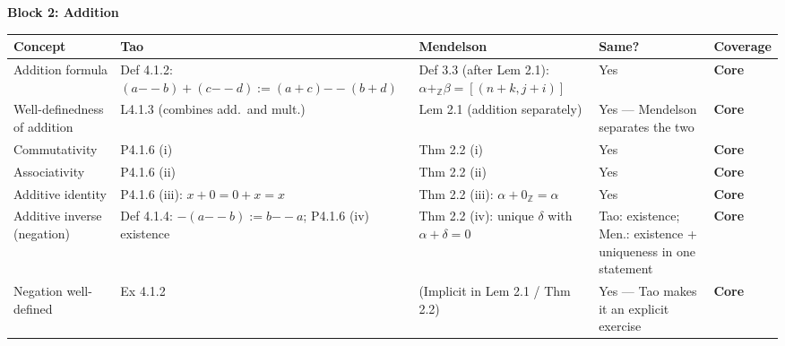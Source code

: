 \begin{exposition}
\bigskip
\end{exposition}

\noindent\textbf{Block 2: Addition}

\begin{exposition}
\smallskip
\end{exposition}
\begin{tabular}{p{} p{} p{} p{} p{}}
\toprule
\textbf{Concept} & \textbf{Tao} & \textbf{Mendelson} & \textbf{Same?} & \textbf{Coverage} \\
\midrule

Addition formula
& Def 4.1.2: $(a{-\!\!-}b)+(c{-\!\!-}d):=(a+c){-\!\!-}(b+d)$
& Def 3.3 (after Lem 2.1): $\alpha+_\mathbb{Z}\beta=[(n+k,j+i)]$
& Yes
& \textbf{Core}
\\[6pt]

Well-definedness of addition
& L4.1.3 (combines add.\ and mult.)
& Lem 2.1 (addition separately)
& Yes --- Mendelson separates the two
& \textbf{Core}
\\[6pt]

Commutativity
& P4.1.6 (i)
& Thm 2.2 (i)
& Yes
& \textbf{Core}
\\[6pt]

Associativity
& P4.1.6 (ii)
& Thm 2.2 (ii)
& Yes
& \textbf{Core}
\\[6pt]

Additive identity
& P4.1.6 (iii): $x+0=0+x=x$
& Thm 2.2 (iii): $\alpha+0_\mathbb{Z}=\alpha$
& Yes
& \textbf{Core}
\\[6pt]

Additive inverse (negation)
& Def 4.1.4: $-(a{-\!\!-}b):=b{-\!\!-}a$; P4.1.6 (iv) existence
& Thm 2.2 (iv): unique $\delta$ with $\alpha+\delta=0$
& Tao: existence; Men.: existence + uniqueness in one statement
& \textbf{Core}
\\[6pt]

Negation well-defined
& Ex 4.1.2
& (Implicit in Lem 2.1 / Thm 2.2)
& Yes --- Tao makes it an explicit exercise
& \textbf{Core}
\\

\bottomrule
\end{tabular}

\begin{exposition}
\bigskip
\end{exposition}

